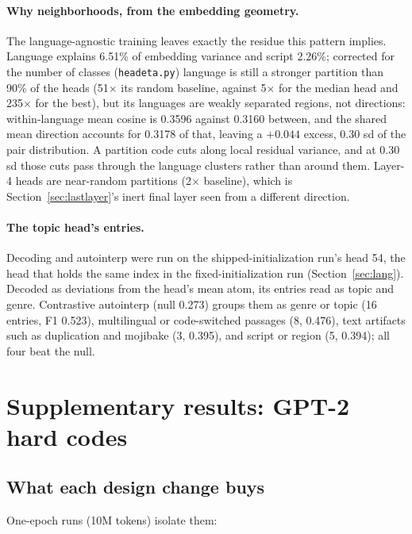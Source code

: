 \paragraph{Why neighborhoods, from the embedding geometry.} The
language-agnostic training leaves exactly the residue this pattern
implies. Language explains 6.51\% of embedding variance and script
2.26\%; corrected for the number of classes (\texttt{headeta.py}) language is still a
stronger partition than 90\% of the heads (51$\times$ its random baseline,
against 5$\times$ for the median head and 235$\times$ for the best), but its
languages are weakly separated regions, not directions: within-language
mean cosine is 0.3596 against 0.3160 between, and the shared mean
direction accounts for 0.3178 of that, leaving a $+0.044$ excess, 0.30 sd
of the pair distribution. A partition code cuts along local residual
variance, and at 0.30 sd those cuts pass through the language clusters
rather than around them. Layer-4 heads are near-random
partitions (2$\times$ baseline), which is Section~\ref{sec:lastlayer}'s
inert final layer seen from a different direction.

\paragraph{The topic head's entries.} Decoding and autointerp
were run on the shipped-initialization run's head 54, the head that holds
the same index in the fixed-initialization run (Section~\ref{sec:lang}).
Decoded as deviations from the head's mean atom, its entries read as
topic and genre. Contrastive autointerp (null 0.273) groups them
as genre or topic (16 entries, F1 0.523), multilingual or code-switched
passages (8, 0.476), text artifacts such as duplication and mojibake (3,
0.395), and script or region (5, 0.394); all four beat the null.

\section{Supplementary results: GPT-2 hard codes}
\label{app:gpt2}

\subsection{What each design change buys}
\label{sec:gpt2ablation}

One-epoch runs (10M tokens) isolate them:

